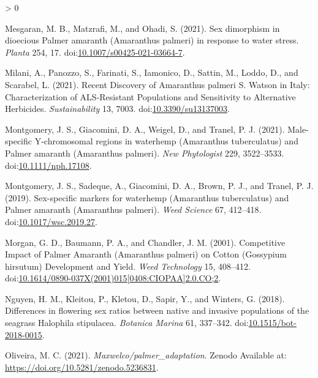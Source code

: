 \documentclass[utf8]{frontiersSCNS}
\newlength{\cslhangindent}
\newenvironment{CSLReferences}[2] %
 {%
  \setlength{\parindent}{0pt}
  \ifodd #1 \everypar{\setlength{\hangindent}{\cslhangindent}}\ignorespaces\fi
  \ifnum #2 > 0
  \setlength{\parskip}{#2\baselineskip}
  \fi
 }%
 {}
\begin{document}
\begin{CSLReferences}{1}{0}
\leavevmode\hypertarget{ref-mesgaran2021}{}%
Mesgaran, M. B., Matzrafi, M., and Ohadi, S. (2021). Sex dimorphism in
dioecious {Palmer} amaranth ({Amaranthus} palmeri) in response to water
stress. \emph{Planta} 254, 17.
doi:\href{https://doi.org/10.1007/s00425-021-03664-7}{10.1007/s00425-021-03664-7}.

\leavevmode\hypertarget{ref-milani2021}{}%
Milani, A., Panozzo, S., Farinati, S., Iamonico, D., Sattin, M., Loddo,
D., and Scarabel, L. (2021). Recent {Discovery} of {Amaranthus} palmeri
{S}. {Watson} in {Italy}: {Characterization} of {ALS}-{Resistant
Populations} and {Sensitivity} to {Alternative Herbicides}.
\emph{Sustainability} 13, 7003.
doi:\href{https://doi.org/10.3390/su13137003}{10.3390/su13137003}.

\leavevmode\hypertarget{ref-montgomery2021}{}%
Montgomery, J. S., Giacomini, D. A., Weigel, D., and Tranel, P. J.
(2021). Male-specific {Y}-chromosomal regions in waterhemp ({Amaranthus}
tuberculatus) and {Palmer} amaranth ({Amaranthus} palmeri). \emph{New
Phytologist} 229, 3522--3533.
doi:\href{https://doi.org/10.1111/nph.17108}{10.1111/nph.17108}.

\leavevmode\hypertarget{ref-montgomery2019}{}%
Montgomery, J. S., Sadeque, A., Giacomini, D. A., Brown, P. J., and
Tranel, P. J. (2019). Sex-specific markers for waterhemp ({Amaranthus}
tuberculatus) and {Palmer} amaranth ({Amaranthus} palmeri). \emph{Weed
Science} 67, 412--418.
doi:\href{https://doi.org/10.1017/wsc.2019.27}{10.1017/wsc.2019.27}.

\leavevmode\hypertarget{ref-morgan2001}{}%
Morgan, G. D., Baumann, P. A., and Chandler, J. M. (2001). Competitive
{Impact} of {Palmer Amaranth} ({Amaranthus} palmeri) on {Cotton}
({Gossypium} hirsutum) {Development} and {Yield}. \emph{Weed Technology}
15, 408--412.
doi:\href{https://doi.org/10.1614/0890-037X(2001)015\%5B0408:CIOPAA\%5D2.0.CO;2}{10.1614/0890-037X(2001)015{[}0408:CIOPAA{]}2.0.CO;2}.

\leavevmode\hypertarget{ref-nguyen2018}{}%
Nguyen, H. M., Kleitou, P., Kletou, D., Sapir, Y., and Winters, G.
(2018). Differences in flowering sex ratios between native and invasive
populations of the seagrass {Halophila} stipulacea. \emph{Botanica
Marina} 61, 337--342.
doi:\href{https://doi.org/10.1515/bot-2018-0015}{10.1515/bot-2018-0015}.

\leavevmode\hypertarget{ref-oliveira2021b}{}%
Oliveira, M. C. (2021). \emph{Maxwelco/palmer\_adaptation}. {Zenodo}
Available at: \url{https://doi.org/10.5281/zenodo.5236831}.


\end{CSLReferences}
\end{document}
